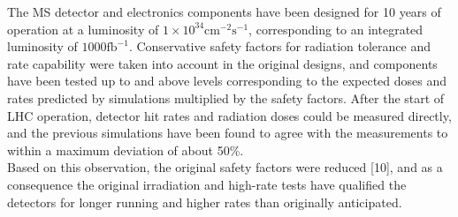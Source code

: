 The MS detector and electronics components have been designed for 10 years of operation
at a luminosity of $\mathrm{1\times 10^{34}cm^{-2} s^{-1}}$, corresponding to an integrated luminosity of $\mathrm{1000 fb^{-1}}$. 
Conservative safety factors for radiation tolerance and rate capability were taken
into account in the original designs, and components have been tested up to and above
levels corresponding to the expected doses and rates predicted by simulations multiplied
by the safety factors. After the start of LHC operation, detector hit rates and radiation doses
could be measured directly, and the previous simulations have been found to agree with
the measurements to within a maximum deviation of about 50\%.
\\Based on this observation, the original safety factors were reduced [10], and as a consequence the original irradiation and high-rate tests have qualified the detectors for longer running and higher rates than originally anticipated.


